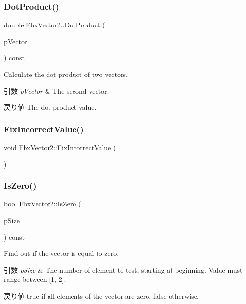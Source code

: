 \subsubsection{\texorpdfstring{Dot\+Product()}{DotProduct()}}
{\footnotesize\ttfamily double Fbx\+Vector2\+::\+Dot\+Product (\begin{DoxyParamCaption}\item[{const \hyperlink{class_fbx_vector2}{Fbx\+Vector2} \&}]{p\+Vector }\end{DoxyParamCaption}) const}

Calculate the dot product of two vectors. 
\begin{DoxyParams}{引数}
{\em p\+Vector} & The second vector. \\
\hline
\end{DoxyParams}
\begin{DoxyReturn}{戻り値}
The dot product value. 
\end{DoxyReturn}
\mbox{\label{class_fbx_vector2_a1045bf41d94e9bce617163959fae50ba}} 
\subsubsection{\texorpdfstring{Fix\+Incorrect\+Value()}{FixIncorrectValue()}}
{\footnotesize\ttfamily void Fbx\+Vector2\+::\+Fix\+Incorrect\+Value (\begin{DoxyParamCaption}{ }\end{DoxyParamCaption})}

\mbox{\label{class_fbx_vector2_ae98104ed051bcace69d39d459c39bae4}} 
\subsubsection{\texorpdfstring{Is\+Zero()}{IsZero()}}
{\footnotesize\ttfamily bool Fbx\+Vector2\+::\+Is\+Zero (\begin{DoxyParamCaption}\item[{int}]{p\+Size = {} }\end{DoxyParamCaption}) const}

Find out if the vector is equal to zero. 
\begin{DoxyParams}{引数}
{\em p\+Size} & The number of element to test, starting at beginning. Value must range between \mbox{[}1, 2\mbox{]}. \\
\hline
\end{DoxyParams}
\begin{DoxyReturn}{戻り値}
{\ttfamily true} if all elements of the vector are zero, {\ttfamily false} otherwise. 
\end{DoxyReturn}
\mbox{\label{class_fbx_vector2_ad49dcb1601d78cee3d50509f5b08ecd4}} 
